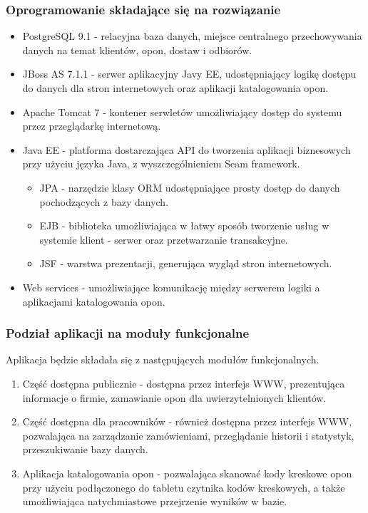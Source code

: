     \subsubsection{Oprogramowanie składające się na rozwiązanie}
      \begin{itemize}
        \item PostgreSQL 9.1 - relacyjna baza danych, miejsce centralnego przechowywania danych na temat klientów, opon, dostaw i odbiorów.
        \item JBoss AS 7.1.1 - serwer aplikacyjny Javy EE, udostępniający logikę dostępu do danych dla stron internetowych oraz aplikacji katalogowania opon.
        \item Apache Tomcat 7 - kontener serwletów umożliwiający dostęp do systemu przez przeglądarkę internetową.
        \item Java EE - platforma dostarczająca API do tworzenia aplikacji biznesowych przy użyciu języka Java, z wyszczególnieniem Seam framework.
          \begin{itemize}
            \item JPA - narzędzie klasy ORM udostępniające prosty dostęp do danych pochodzących z bazy danych.
            \item EJB - biblioteka umożliwiająca w łatwy sposób tworzenie usług w systemie klient - serwer oraz przetwarzanie transakcyjne.
            \item JSF - warstwa prezentacji, generująca wygląd stron internetowych.
          \end{itemize}
        \item Web services - umożliwiające komunikację między serwerem logiki a aplikacjami katalogowania opon.
      \end{itemize}
    \subsubsection{Podział aplikacji na moduły funkcjonalne}
      Aplikacja będzie składała się z następujących modułów funkcjonalnych.
      \begin{enumerate}
        \item Część dostępna publicznie - dostępna przez interfejs WWW, prezentująca informacje o firmie, zamawianie opon dla uwierzytelnionych klientów.
        \item Część dostępna dla pracowników - również dostępna przez interfejs WWW, pozwalająca na zarządzanie zamówieniami, przeglądanie historii i statystyk, przeszukiwanie bazy danych.
        \item Aplikacja katalogowania opon - pozwalająca skanować kody kreskowe opon przy użyciu podłączonego do tabletu czytnika kodów kreskowych, a także umożliwiająca natychmiastowe przejrzenie wyników w bazie.
      \end{enumerate}
